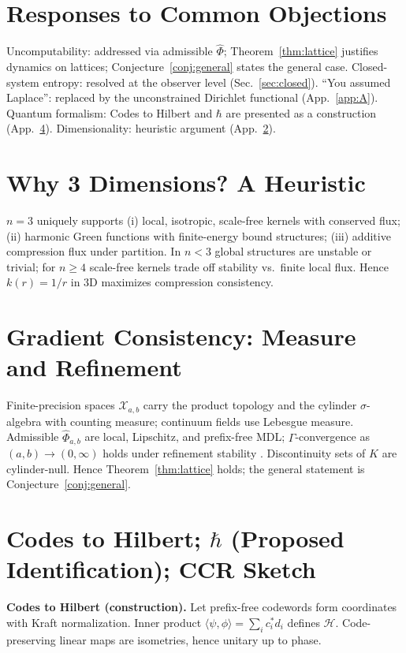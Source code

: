 \documentclass[aps,preprint,onecolumn,longbibliography,nofootinbib]{revtex4-2}
\numberwithin{equation}{section}        %
\begin{document}
\section{Responses to Common Objections}\label{app:D}
Uncomputability: addressed via admissible $\widehat\Phi$; Theorem~\ref{thm:lattice} justifies dynamics on lattices; Conjecture~\ref{conj:general} states the general case. Closed-system entropy: resolved at the observer level (Sec.~\ref{sec:closed}). ``You assumed Laplace'': replaced by the unconstrained Dirichlet functional (App.~\ref{app:A}). Quantum formalism: Codes to Hilbert and $\hbar$ are presented as a construction (App.~\ref{app:Q}). Dimensionality: heuristic argument (App.~\ref{app:E}).

\section{Why 3 Dimensions? A Heuristic}\label{app:E}
$n=3$ uniquely supports (i) local, isotropic, scale-free kernels with conserved flux; (ii) harmonic Green functions with finite-energy bound structures; (iii) additive compression flux under partition. In $n<3$ global structures are unstable or trivial; for $n\ge4$ scale-free kernels trade off stability vs.\ finite local flux. Hence $k(r)=1/r$ in $3$D maximizes compression consistency.

\section{Gradient Consistency: Measure and Refinement}\label{app:grad}
Finite-precision spaces $\mathcal X_{a,b}$ carry the product topology and the cylinder $\sigma$-algebra with counting measure; continuum fields use Lebesgue measure. Admissible $\widehat\Phi_{a,b}$ are local, Lipschitz, and prefix-free MDL; $\Gamma$-convergence as $(a,b)\to (0,\infty)$ holds under refinement stability \cite{Braides2002}. Discontinuity sets of $K$ are cylinder-null. Hence Theorem~\ref{thm:lattice} holds; the general statement is Conjecture~\ref{conj:general}.

\section{Codes to Hilbert; $\hbar$ (Proposed Identification); CCR Sketch}\label{app:Q}
\textbf{Codes to Hilbert (construction).} Let prefix-free codewords form coordinates with Kraft normalization. Inner product $\langle \psi,\phi\rangle=\sum_i c_i^* d_i$ defines $\mathcal{H}$. Code-preserving linear maps are isometries, hence unitary up to phase.
\end{document}
